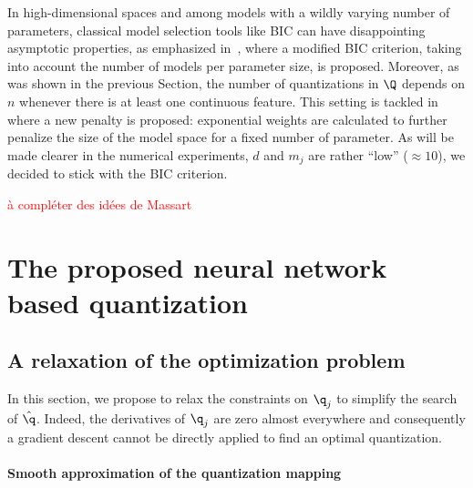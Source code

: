 In high-dimensional spaces and among models with a wildly varying number of parameters, classical model selection tools like BIC can have disappointing asymptotic properties, as emphasized in~\cite{chen2008extended}, where a modified BIC criterion, taking into account the number of models per parameter size, is proposed. Moreover, as was shown in the previous Section, the number of quantizations in $\Q$ depends on $n$ whenever there is at least one continuous feature. This setting is tackled in~\cite{} where a new penalty is proposed: exponential weights are calculated to further penalize the size of the model space for a fixed number of parameter. As will be made clearer in the numerical experiments, $d$ and $m_j$ are rather ``low'' ($\approx 10$), we decided to stick with the BIC criterion.


\textcolor{red}{à compléter des idées de Massart}

\section{The proposed neural network based quantization}
\label{sec:proposal}

\subsection{A relaxation of the optimization problem}

In this section, we propose to relax the constraints on $\q_j$ to simplify the search of $\hat{\q}$. Indeed, the derivatives of $\q_j$ are zero almost everywhere and consequently a gradient descent cannot be directly applied to find an optimal quantization.

\paragraph{Smooth approximation of the quantization mapping}


